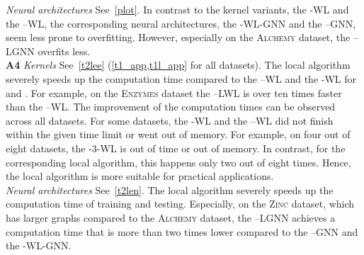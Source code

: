 \documentclass{article}
\theoremstyle{definition}
\newcommand{\kwl}{-\textsf{WL}\xspace}
\newcommand{\deltakwl}{--\textsf{WL}\xspace}
\begin{document}
\textit{Neural architectures} See~\cref{plot}. In contrast to the kernel variants, the -\textsf{WL} and the --\textsf{WL}, the corresponding neural architectures, the -\textsf{WL-GNN} and the --\textsf{GNN}, seem less prone to overfitting. However, especially on the \textsc{Alchemy} dataset, the --\textsf{LGNN} overfits less. \\
\textbf{A4}
\textit{Kernels} See~\cref{t2lee} (\cref{t1_app,t1l_app} for all datasets). The local algorithm severely speeds up the computation time compared to the \deltakwl and the \kwl for  and . For example, on the \textsc{Enzymes} dataset the --\textsf{LWL} is over ten times faster than the --\textsf{WL}.  The improvement of the computation times can be observed across all datasets.  For some datasets, the -\textsf{WL} and the --\textsf{WL} did not finish within the given time limit or went out of memory. For example, on four out of eight datasets, the -3-\textsf{WL} is out of time or out of memory. In contrast, for the corresponding local algorithm, this happens only two out of eight times. Hence, the local algorithm is more suitable for practical applications. \\
\textit{Neural architectures} See~\cref{t2len}. The local algorithm severely speeds up the computation time of training and testing. Especially, on the \textsc{Zinc} dataset, which has larger graphs compared to the \textsc{Alchemy} dataset, the --\textsf{LGNN} achieves a computation time that is more  than two times lower compared to the --\textsf{GNN} and the -\textsf{WL-GNN}.
\end{document}
